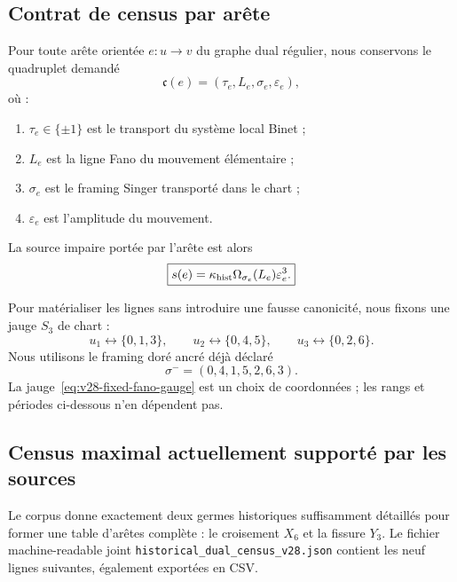 \documentclass[11pt,a4paper]{article}
\begin{document}
\subsection{Contrat de census par arête}

Pour toute arête orientée $e:u\to v$ du graphe dual régulier, nous conservons le quadruplet demandé
\begin{equation}\label{eq:v28-edge-tuple}
 \boxed{
 \mathfrak c(e)
 =
 (\tau_e,L_e,\sigma_e,\varepsilon_e),}
\end{equation}
où :
\begin{enumerate}[label=\textup{(\roman*)}]
\item $\tau_e\in\{\pm1\}$ est le transport du système local Binet ;
\item $L_e$ est la ligne Fano du mouvement élémentaire ;
\item $\sigma_e$ est le framing Singer transporté dans le chart ;
\item $\varepsilon_e$ est l'amplitude du mouvement.
\end{enumerate}
La source impaire portée par l'arête est alors
\begin{equation}\label{eq:v28-edge-source}
 \boxed{
 s(e)
 =
 \kappa_{\rm hist}
 \Omega_{\sigma_e}(L_e)
 \varepsilon_e^3.}
\end{equation}

Pour matérialiser les lignes sans introduire une fausse canonicité, nous fixons une jauge $S_3$ de chart :
\begin{equation}\label{eq:v28-fixed-fano-gauge}
 \boxed{
 u_1\leftrightarrow\{0,1,3\},\qquad
 u_2\leftrightarrow\{0,4,5\},\qquad
 u_3\leftrightarrow\{0,2,6\}.}
\end{equation}
Nous utilisons le framing doré ancré déjà déclaré
\[
 \sigma^-=(0,4,1,5,2,6,3).
\]
La jauge~\eqref{eq:v28-fixed-fano-gauge} est un choix de coordonnées ; les rangs et périodes ci-dessous n'en dépendent pas.

\subsection{Census maximal actuellement supporté par les sources}

Le corpus donne exactement deux germes historiques suffisamment détaillés pour former une table d'arêtes complète : le croisement $X_6$ et la fissure $Y_3$. Le fichier machine-readable joint \texttt{historical\_dual\_census\_v28.json} contient les neuf lignes suivantes, également exportées en CSV.
\end{document}
